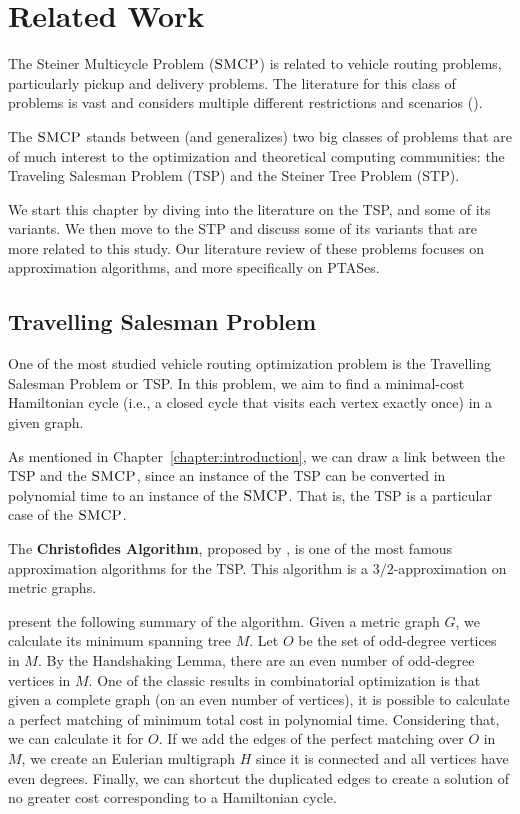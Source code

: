 \chapter{Related Work}
\label{chapter:related_work}


The Steiner Multicycle Problem (\(\textsc{SMCP}\)) is related to vehicle routing problems, particularly pickup and delivery problems. The literature for this class of problems is vast and considers multiple different restrictions and scenarios (\cite{surveyRouter}).

The \(\textsc{SMCP}\) stands between (and generalizes) two big classes of problems that are of much interest to the optimization and theoretical computing communities: the Traveling Salesman Problem (TSP) and the Steiner Tree Problem (STP).

We start this chapter by diving into the literature on the TSP, and some of its variants. We then move to the STP and discuss some of its variants that are more related to this study. 
Our literature review of these problems focuses on approximation algorithms, and more specifically on PTASes.

\section{Travelling Salesman Problem}

One of the most studied vehicle routing optimization problem is the Travelling Salesman Problem or TSP. In this problem, we aim to find a minimal-cost Hamiltonian cycle (i.e., a closed cycle that visits each vertex exactly once) in a given graph.

As mentioned in Chapter~\ref{chapter:introduction}, we can draw a link between the TSP and the \(\textsc{SMCP}\), since an instance of the TSP can be converted in polynomial time to an instance of the \(\textsc{SMCP}\). That is, the TSP is a particular case of the \(\textsc{SMCP}\).

The \textbf{Christofides Algorithm}, proposed by \cite{Christofides2022WorstCaseAO}, is one of the most famous approximation algorithms for the TSP. This algorithm is a \(3/2\)-approximation on metric graphs.

\cite{williamsonApxAlgs} present the following summary of the algorithm. Given a metric graph \(G\), we calculate its minimum spanning tree \(M\). Let \(O\) be the set of odd-degree vertices in \(M\). By the Handshaking Lemma, there are an even number of odd-degree vertices in \(M\). One of the classic results in combinatorial optimization is that given a complete graph (on an even number of vertices), it is possible to calculate a perfect matching of minimum total cost in polynomial time. Considering that, we can calculate it for \(O\). If we add the edges of the perfect matching over \(O\) in \(M\), we create an Eulerian multigraph \(H\) since it is connected and all vertices have even degrees. Finally, we can shortcut the duplicated edges to create a solution of no greater cost corresponding to a Hamiltonian cycle.

